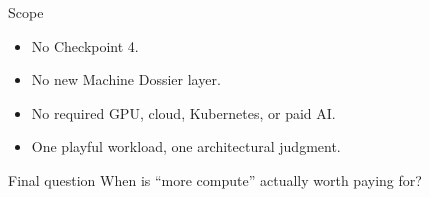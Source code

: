 \documentclass{beamer}
\begin{document}
\begin{frame}{Scope}
\begin{itemize}
\item No Checkpoint 4.
\item No new Machine Dossier layer.
\item No required GPU, cloud, Kubernetes, or paid AI.
\item One playful workload, one architectural judgment.
\end{itemize}
\end{frame}

\begin{frame}{Final question}
\centering\Large When is ``more compute'' actually worth paying for?
\end{frame}
\end{document}
